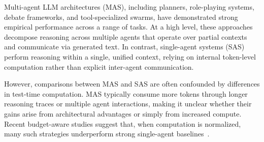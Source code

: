 \documentclass{article} %
\begin{document}
    
    
    

Multi-agent LLM architectures (MAS), including planners, role-playing systems, debate frameworks, and tool-specialized swarms, have demonstrated strong empirical performance across a range of tasks. At a high level, these approaches decompose reasoning across multiple agents that operate over partial contexts and communicate via generated text. In contrast, single-agent systems (SAS) perform reasoning within a single, unified context, relying on internal token-level computation rather than explicit inter-agent communication.

However, comparisons between MAS and SAS are often confounded by differences in test-time computation. MAS typically consume more tokens through longer reasoning traces or multiple agent interactions, making it unclear whether their gains arise from architectural advantages or simply from increased compute. Recent budget-aware studies suggest that, when computation is normalized, many such strategies underperform strong single-agent baselines~\citep{wang2024reasoning,han2025token}.
\end{document}

